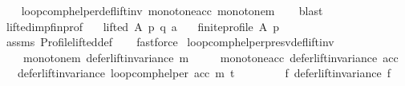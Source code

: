 \begin{isabellebody}
%
\isadelimproof
\ \ %
\endisadelimproof
%
\isatagproof
{}\isamarkupfalse%
\ loop{\isacharunderscore}{\kern0pt}comp{\isacharunderscore}{\kern0pt}helper{\isacharunderscore}{\kern0pt}def{\isacharunderscore}{\kern0pt}lift{\isacharunderscore}{\kern0pt}inv\ monotone{\isacharunderscore}{\kern0pt}acc\ monotone{\isacharunderscore}{\kern0pt}m\isanewline
\ \ \isamarkupfalse%
\ blast%
\endisatagproof
{\isafoldproof}%
%
\isadelimproof
\isanewline
%
\endisadelimproof
\isanewline
{}\isamarkupfalse%
\ lifted{\isacharunderscore}{\kern0pt}imp{\isacharunderscore}{\kern0pt}fin{\isacharunderscore}{\kern0pt}prof{\isacharcolon}{\kern0pt}\isanewline
\ \ \ {\isachardoublequoteopen}lifted\ A\ p\ q\ a{\isachardoublequoteclose}\isanewline
\ \ \ {\isachardoublequoteopen}finite{\isacharunderscore}{\kern0pt}profile\ A\ p{\isachardoublequoteclose}\isanewline
%
\isadelimproof
\ \ %
\endisadelimproof
%
\isatagproof
{}\isamarkupfalse%
\ assms\ Profile{\isachardot}{\kern0pt}lifted{\isacharunderscore}{\kern0pt}def\isanewline
\ \ \isamarkupfalse%
\ fastforce%
\endisatagproof
{\isafoldproof}%
%
\isadelimproof
\isanewline
%
\endisadelimproof
\isanewline
{}\isamarkupfalse%
\ loop{\isacharunderscore}{\kern0pt}comp{\isacharunderscore}{\kern0pt}helper{\isacharunderscore}{\kern0pt}presv{\isacharunderscore}{\kern0pt}def{\isacharunderscore}{\kern0pt}lift{\isacharunderscore}{\kern0pt}inv{\isacharcolon}{\kern0pt}\isanewline
\ \ \isanewline
\ \ \ \ monotone{\isacharunderscore}{\kern0pt}m{\isacharcolon}{\kern0pt}\ {\isachardoublequoteopen}defer{\isacharunderscore}{\kern0pt}lift{\isacharunderscore}{\kern0pt}invariance\ m{\isachardoublequoteclose}\ \isanewline
\ \ \ \ monotone{\isacharunderscore}{\kern0pt}acc{\isacharcolon}{\kern0pt}\ {\isachardoublequoteopen}defer{\isacharunderscore}{\kern0pt}lift{\isacharunderscore}{\kern0pt}invariance\ acc{\isachardoublequoteclose}\isanewline
\ \ \ {\isachardoublequoteopen}defer{\isacharunderscore}{\kern0pt}lift{\isacharunderscore}{\kern0pt}invariance\ {\isacharparenleft}{\kern0pt}loop{\isacharunderscore}{\kern0pt}comp{\isacharunderscore}{\kern0pt}helper\ acc\ m\ t{\isacharparenright}{\kern0pt}{\isachardoublequoteclose}\isanewline
%
\isadelimproof
%
\endisadelimproof
%
\isatagproof
{}\isamarkupfalse%
\ {\isacharminus}{\kern0pt}\isanewline
\ \ \isamarkupfalse%
\isanewline
\ \ \ \ {\isachardoublequoteopen}{\isasymforall}f{\isachardot}{\kern0pt}\ {\isacharparenleft}{\kern0pt}defer{\isacharunderscore}{\kern0pt}lift{\isacharunderscore}{\kern0pt}invariance\ f\ {\isasymor}\isanewline

\end{isabellebody}
